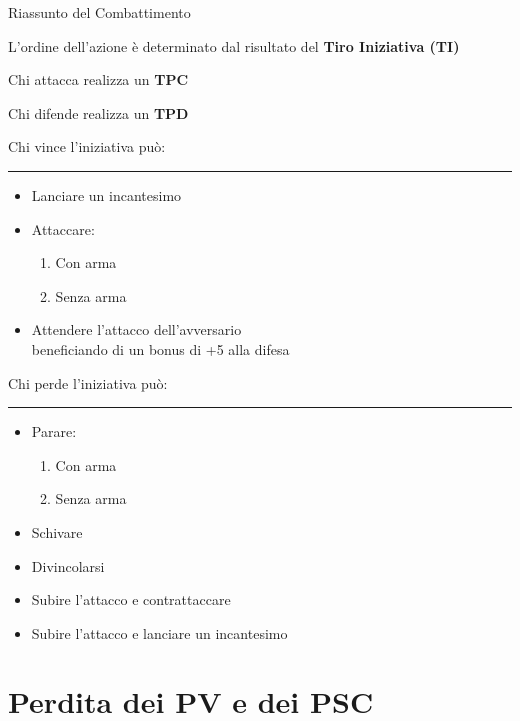 \begin{table*}

  \centering
  {\sc\Large Riassunto del Combattimento\par}\bigskip
  \normalsize 
  L'ordine dell'azione \`e determinato dal risultato del \textbf{Tiro Iniziativa (TI)}

  Chi attacca realizza un \textbf{TPC}

  Chi difende realizza un \textbf{TPD}

  \bigskip

  \footnotesize
  \parbox[t]{6cm}{
    {\large\sc\centering Chi vince l'iniziativa pu\`o:}\bigskip
    \hrule
    \begin{itemize}
      \itemsep -3pt
    \item Lanciare un incantesimo
    \item Attaccare:
      \begin{enumerate}
        \itemsep -3pt
      \item Con arma
      \item Senza arma
      \end{enumerate}
    \item Attendere l'attacco dell'avversario\\ beneficiando di un bonus
      di +5 alla difesa
    \end{itemize}
    } \hspace{2cm}
  \parbox[t]{6cm} {
    {\large\sc\centering Chi perde l'iniziativa pu\`o:} \bigskip

    \hrule
    \begin{itemize}
      \itemsep -3pt
    \item Parare: 
      \begin{enumerate}
        \itemsep -3pt
      \item Con arma
      \item Senza arma
      \end{enumerate}
    \item Schivare 
    \item Divincolarsi
    \item Subire l'attacco e contrattaccare 
    \item Subire l'attacco e lanciare un
      incantesimo
    \end{itemize}
    } 

\end{table*}
\fi

{\raggedright \section{Perdita dei PV e dei PSC}}
\label{perditapvpsc}
  
